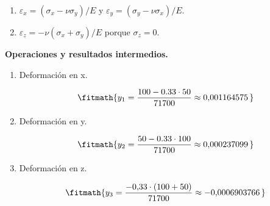 \begin{enumerate}

\item $\varepsilon_x = (\sigma_x - \nu\sigma_y)/E$ y $\varepsilon_y = (\sigma_y - \nu\sigma_x)/E$.

\item $\varepsilon_z = -\nu(\sigma_x + \sigma_y)/E$ porque $\sigma_z = 0$.

\end{enumerate}

\noindent\textbf{Operaciones y resultados intermedios.}

\begin{enumerate}

\item Deformación en x.

\[\fitmath{y_{1}=\frac{100-0.33\cdot 50}{71700}\approx 0{,}001164575\,}\]

\item Deformación en y.

\[\fitmath{y_{2}=\frac{50-0.33\cdot 100}{71700}\approx 0{,}000237099\,}\]

\item Deformación en z.

\[\fitmath{y_{3}=\frac{-0{,}33\cdot \left(100+50\right)}{71700}\approx -0{,}0006903766\,}\]

\end{enumerate}
